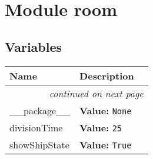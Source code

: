 %
%
%


\section{Module room}

    \label{room}


  \subsection{Variables}

    \vspace{-1cm}
\hspace{\varindent}\begin{longtable}{|p{\varnamewidth}|p{\vardescrwidth}|l}
\cline{1-2}
\cline{1-2} \centering \textbf{Name} & \centering \textbf{Description}& \\
\cline{1-2}
\endhead\cline{1-2}\multicolumn{3}{r}{\small\textit{continued on next page}}\\\endfoot\cline{1-2}
\endlastfoot\raggedright \_\-\_\-p\-a\-c\-k\-a\-g\-e\-\_\-\_\- & \raggedright \textbf{Value:} 
{\tt None}&\\
\cline{1-2}
\raggedright d\-i\-v\-i\-s\-i\-o\-n\-T\-i\-m\-e\- & \raggedright \textbf{Value:} 
{\tt 25}&\\
\cline{1-2}
\raggedright s\-h\-o\-w\-S\-h\-i\-p\-S\-t\-a\-t\-e\- & \raggedright \textbf{Value:} 
{\tt True}&\\
\cline{1-2}
\end{longtable}



